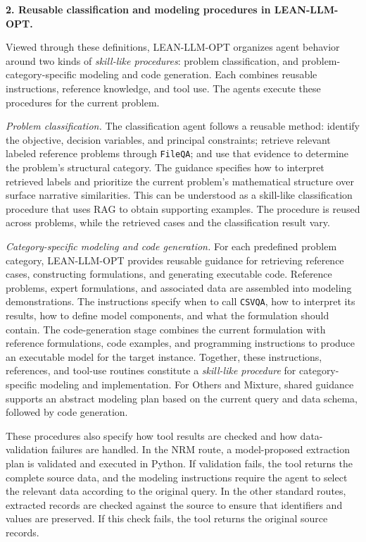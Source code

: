\documentclass[11pt]{article}
\begin{document}
{\medskip
\noindent\textbf{2. Reusable classification and modeling procedures in LEAN-LLM-OPT.}

Viewed through these definitions, LEAN-LLM-OPT organizes agent
behavior around two kinds of \emph{skill-like procedures}:
problem classification, and problem-category-specific modeling
and code generation. Each combines reusable instructions,
reference knowledge, and tool use. The agents execute these
procedures for the current problem.

\emph{Problem classification.}
The classification agent follows a reusable method: identify the
objective, decision variables, and principal constraints; retrieve
relevant labeled reference problems through \texttt{FileQA}; and
use that evidence to determine the problem's structural category.
The guidance specifies how to interpret retrieved labels and
prioritize the current problem's mathematical structure over
surface narrative similarities. This can be understood as a
skill-like classification procedure that uses RAG to obtain
supporting examples. The procedure is reused across problems,
while the retrieved cases and the classification result vary.

\emph{Category-specific modeling and code generation.}
For each predefined problem category, LEAN-LLM-OPT provides
reusable guidance for retrieving reference cases, constructing
formulations, and generating executable code. Reference problems,
expert formulations, and associated data are assembled into
modeling demonstrations. The instructions specify when to call
\texttt{CSVQA}, how to interpret its results, how to define model
components, and what the formulation should contain. The
code-generation stage combines the current formulation with
reference formulations, code examples, and programming instructions
to produce an executable model for the target instance. Together,
these instructions, references, and tool-use routines constitute
a \emph{skill-like procedure} for category-specific modeling and
implementation. For Others and Mixture, shared guidance supports
an abstract modeling plan based on the current query and data
schema, followed by code generation.

These procedures also specify how tool results are checked and
how data-validation failures are handled. In the NRM route, a
model-proposed extraction plan is validated and executed in Python.
If validation fails, the tool returns the complete source data,
and the modeling instructions require the agent to select the
relevant data according to the original query. In the other
standard routes, extracted records are checked against the source
to ensure that identifiers and values are preserved. If this
check fails, the tool returns the original source records.

}
\end{document}
